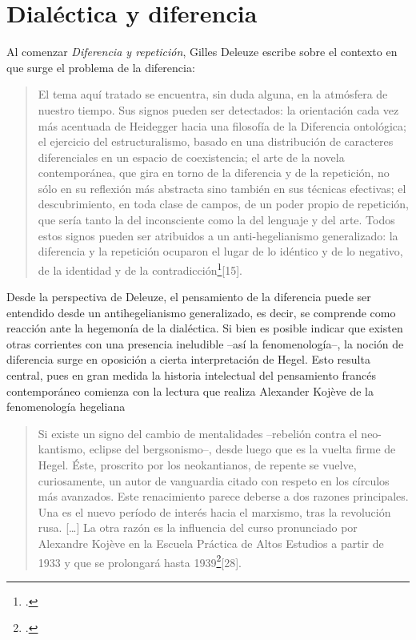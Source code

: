 \section{Dialéctica y diferencia}


Al comenzar \emph{Diferencia y repetición}, Gilles Deleuze escribe sobre el contexto en que surge el problema de la diferencia:

\begin{quote}
El tema aquí tratado se encuentra, sin duda alguna, en la atmósfera de nuestro tiempo. Sus signos pueden ser detectados: la orientación cada vez más acentuada de Heidegger hacia una filosofía de la Diferencia ontológica; el ejercicio del estructuralismo, basado en una distribución de caracteres diferenciales en un espacio de coexistencia; el arte de la novela contemporánea, que gira en torno de la diferencia y de la repetición, no sólo en su reflexión más abstracta sino también en sus técnicas efectivas; el descubrimiento, en toda clase de campos, de un poder propio de repetición, que sería tanto la del inconsciente como la del lenguaje y del arte. Todos estos signos pueden ser atribuidos a un anti-hegelianismo generalizado: la diferencia y la repetición ocuparon el lugar de lo idéntico y de lo negativo, de la identidad y de la contradicción\footcite{@6961-DELEUZE2002}[15].
\end{quote}

Desde la perspectiva de Deleuze, el pensamiento de la diferencia puede ser entendido desde un antihegelianismo generalizado, es decir, se comprende como reacción ante la hegemonía de la dialéctica. Si bien es posible indicar que existen otras corrientes con una presencia ineludible --así la fenomenología--, la noción de diferencia surge en oposición a cierta interpretación de Hegel. Esto resulta central, pues en gran medida la historia intelectual del pensamiento francés contemporáneo comienza con la lectura que realiza Alexander Kojève de la fenomenología hegeliana

\begin{quote}
Si existe un signo del cambio de mentalidades --rebelión contra el neo-kantismo, eclipse del bergsonismo--, desde luego que es la vuelta firme de Hegel. Éste, proscrito por los neokantianos, de repente se vuelve, curiosamente, un autor de vanguardia citado con respeto en los círculos más avanzados. Este renacimiento parece deberse a dos razones principales. Una es el nuevo período de interés hacia el marxismo, tras la revolución rusa. {[}\ldots{]} La otra razón es la influencia del curso pronunciado por Alexandre Kojève en la Escuela Práctica de Altos Estudios a partir de 1933 y que se prolongará hasta 1939\footcite{@6962-DESCOMBES1998}[28].
\end{quote}


